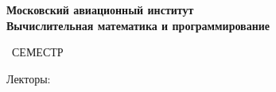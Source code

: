 \begin{titlepage}
	\clearpage\thispagestyle{empty}
	\centering
	
	\textbf{Московский авиационный институт \\ Вычислительная математика и программирование}
	\vspace{33ex}
	
	{\textbf{\FullCourseName}}
	
	\SemesterNumber\ СЕМЕСТР
	\vspace{1ex}
	
	Лекторы: \textit{\Lecturer}
\end{titlepage}